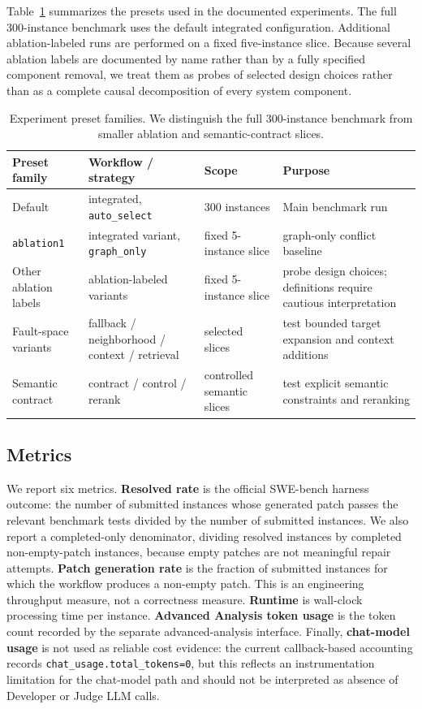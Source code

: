 \documentclass[11pt]{article}
\begin{document}
Table~\ref{tab:presets} summarizes the presets used in the documented experiments.  The full 300-instance benchmark uses the default integrated configuration.  Additional ablation-labeled runs are performed on a fixed five-instance slice.  Because several ablation labels are documented by name rather than by a fully specified component removal, we treat them as probes of selected design choices rather than as a complete causal decomposition of every system component.

\begin{table}[t]
\centering
\small
\begin{tabular}{llll}
\toprule
Preset family & Workflow / strategy & Scope & Purpose \\
\midrule
Default & integrated, \texttt{auto\_select} & 300 instances & Main benchmark run \\
\texttt{ablation1} & integrated variant, \texttt{graph\_only} & fixed 5-instance slice & graph-only conflict baseline \\
Other ablation labels & ablation-labeled variants & fixed 5-instance slice & probe design choices; definitions require cautious interpretation \\
Fault-space variants & fallback / neighborhood / context / retrieval & selected slices & test bounded target expansion and context additions \\
Semantic contract & contract / control / rerank & controlled semantic slices & test explicit semantic constraints and reranking \\
\bottomrule
\end{tabular}
\caption{Experiment preset families.  We distinguish the full 300-instance benchmark from smaller ablation and semantic-contract slices.}
\label{tab:presets}
\end{table}

\subsection{Metrics}
\label{subsec:metrics}

We report six metrics.  \textbf{Resolved rate} is the official SWE-bench harness outcome: the number of submitted instances whose generated patch passes the relevant benchmark tests divided by the number of submitted instances.  We also report a completed-only denominator, dividing resolved instances by completed non-empty-patch instances, because empty patches are not meaningful repair attempts.  \textbf{Patch generation rate} is the fraction of submitted instances for which the workflow produces a non-empty patch.  This is an engineering throughput measure, not a correctness measure.  \textbf{Runtime} is wall-clock processing time per instance.  \textbf{Advanced Analysis token usage} is the token count recorded by the separate advanced-analysis interface.  Finally, \textbf{chat-model usage} is not used as reliable cost evidence: the current callback-based accounting records \texttt{chat\_usage.total\_tokens=0}, but this reflects an instrumentation limitation for the chat-model path and should not be interpreted as absence of Developer or Judge LLM calls.



\end{document}
